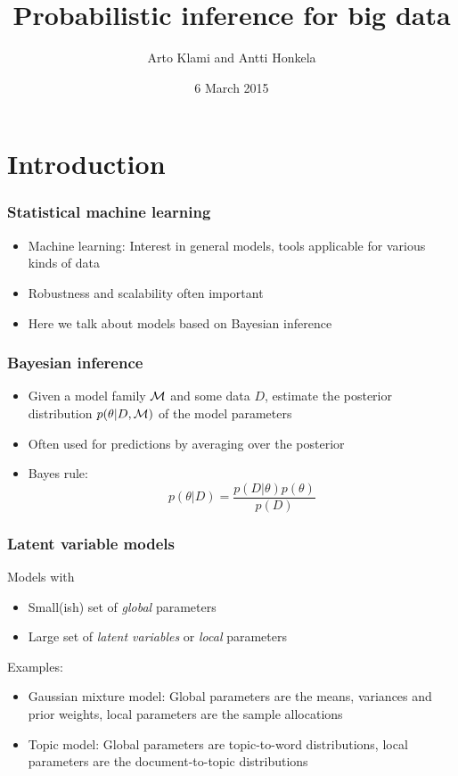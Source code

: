 \documentclass{beamer}
\title{Probabilistic inference for big data}
\author{Arto Klami and Antti Honkela}
\date{6 March 2015}
\begin{document}
\frame{\titlepage}


\section{Introduction}

\begin{frame}
  \frametitle{Statistical machine learning}

  \begin{itemize}
  \item Machine learning: Interest in general models, tools applicable
    for various kinds of data
  \item Robustness and scalability often important
  \item Here we talk about models based on Bayesian inference
  \end{itemize}
\end{frame}

\begin{frame}
  \frametitle{Bayesian inference}

  \begin{itemize}
  \item Given a model family ${\cal M}$ and some data $D$, estimate
    the posterior distribution $p(\theta|D,{\cal M})$ of the model
    parameters
  \item Often used for predictions by averaging over the posterior
  \item Bayes rule:
    \[
    p(\theta|D) = \frac{p(D|\theta)p(\theta)}{p(D)}
    \]
  \end{itemize}
\end{frame}

\begin{frame}
  \frametitle{Latent variable models}

  Models with
  \begin{itemize}
  \item Small(ish) set of \emph{global} parameters
  \item Large set of \emph{latent variables} or \emph{local} parameters
  \end{itemize}

  Examples:
  \begin{itemize}
  \item Gaussian mixture model: Global parameters are the means,
    variances and prior weights, local parameters are the sample
    allocations
  \item Topic model: Global parameters are topic-to-word distributions,
    local parameters are the document-to-topic distributions
  \end{itemize}
\end{frame}
\end{document}
